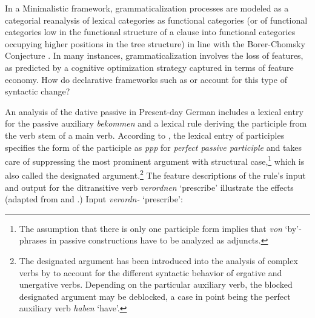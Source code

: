 \documentclass[output=paper
                ,modfonts
                ,nonflat
	        ,collection
	        ,collectionchapter
	        ,collectiontoclongg
 	        ,biblatex
                ,babelshorthands
                ,newtxmath
                ,draftmode
                ,colorlinks, citecolor=brown
]{./langsci/langscibook}
\begin{document}
In a Minimalistic framework, grammaticalization processes are modeled as a categorial reanalysis of lexical categories as functional categories (or of functional categories low in the functional structure of a clause into functional categories occupying higher positions in the tree structure) in line with the Borer-Chomsky Conjecture \citep[17]{RobRou2003}. In many instances, grammaticalization involves the loss of features, as predicted by a cognitive optimization strategy captured in terms of feature economy. How do declarative frameworks such as \lfg or \hpsg account for this type of syntactic change? 

An \hpsg analysis of the dative passive in Present-day German includes a lexical entry for the passive auxiliary \textit{bekommen} and a lexical rule deriving the participle from the verb stem of a main verb. According to \cite[288]{mueller2018}, the lexical entry of participles specifies the form of the participle as \textit{ppp} for \textit{perfect passive participle} and takes care of suppressing the most prominent argument with structural case,\footnote{The assumption that there is only one participle form implies that \textit{von} `by'-phrases in passive constructions have to be analyzed as adjuncts.} which is also called the designated argument.\footnote{The designated argument has been introduced into the analysis of complex verbs by \cite{haider1986} to account for the different syntactic behavior of ergative and unergative verbs. Depending on the particular auxiliary verb, the blocked designated argument may be deblocked, a case in point being the perfect auxiliary verb \textit{haben} `have'.} The feature descriptions of the rule's input and output for the ditransitive verb \textit{verordnen} `prescribe' illustrate the effects (adapted from \cite[149]{mueller2002} and \cite[285]{mueller2018}.)
\ea \label{active}
Input \textit{verordn-} `prescribe': \\
\z 
\end{document}
